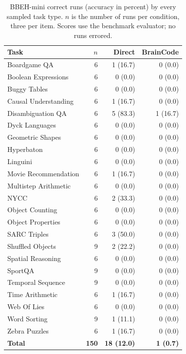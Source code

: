 \documentclass[11pt]{article}
\newcommand{\bc}{BrainCode}
\begin{document}
\begin{table}[t]
\centering\small
\setlength{\tabcolsep}{5pt}
\begin{tabular}{lrrr}
\toprule
Task & $n$ & Direct & \bc{}\\\midrule
Boardgame QA & 6 & 1 (16.7) & 0 (0.0) \\
Boolean Expressions & 6 & 0 (0.0) & 0 (0.0) \\
Buggy Tables & 6 & 0 (0.0) & 0 (0.0) \\
Causal Understanding & 6 & 1 (16.7) & 0 (0.0) \\
Disambiguation QA & 6 & 5 (83.3) & 1 (16.7) \\
Dyck Languages & 6 & 0 (0.0) & 0 (0.0) \\
Geometric Shapes & 6 & 0 (0.0) & 0 (0.0) \\
Hyperbaton & 6 & 0 (0.0) & 0 (0.0) \\
Linguini & 6 & 0 (0.0) & 0 (0.0) \\
Movie Recommendation & 6 & 1 (16.7) & 0 (0.0) \\
Multistep Arithmetic & 6 & 0 (0.0) & 0 (0.0) \\
NYCC & 6 & 2 (33.3) & 0 (0.0) \\
Object Counting & 6 & 0 (0.0) & 0 (0.0) \\
Object Properties & 6 & 0 (0.0) & 0 (0.0) \\
SARC Triples & 6 & 3 (50.0) & 0 (0.0) \\
Shuffled Objects & 9 & 2 (22.2) & 0 (0.0) \\
Spatial Reasoning & 6 & 0 (0.0) & 0 (0.0) \\
SportQA & 9 & 0 (0.0) & 0 (0.0) \\
Temporal Sequence & 9 & 0 (0.0) & 0 (0.0) \\
Time Arithmetic & 6 & 1 (16.7) & 0 (0.0) \\
Web Of Lies & 6 & 0 (0.0) & 0 (0.0) \\
Word Sorting & 9 & 1 (11.1) & 0 (0.0) \\
Zebra Puzzles & 6 & 1 (16.7) & 0 (0.0) \\
\midrule
\textbf{Total} &\textbf{150}&\textbf{18 (12.0)}&\textbf{1 (0.7)}\\
\bottomrule
\end{tabular}
\caption{BBEH-mini correct runs (accuracy in percent) by every sampled task type. $n$ is the number of runs per condition, three per item. Scores use the benchmark evaluator; no runs errored.}
\label{tab:improvement}
\end{table}
\end{document}
